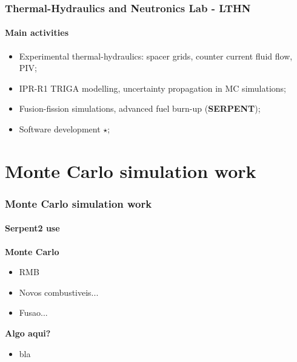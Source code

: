 \documentclass[svgnames,smaller,table]{beamer}
\begin{document}
\begin{frame}
  \frametitle{Thermal-Hydraulics and Neutronics Lab - LTHN}
  \framesubtitle{Main activities}
  \begin{center}
    \begin{itemize}
    \item Experimental thermal-hydraulics: spacer grids, counter current fluid flow, PIV;
    \item IPR-R1 TRIGA modelling, uncertainty propagation in MC simulations;
    \item Fusion-fission simulations, advanced fuel burn-up (\textbf{SERPENT});
    \item Software development $\star$;
    \end{itemize}
  \end{center}
\end{frame}

\section{Monte Carlo simulation work}
\begin{frame}
  \frametitle{Monte Carlo simulation work}
  \framesubtitle{Serpent2 use}
  \textbf{Monte Carlo}
    \begin{itemize}
    \item RMB
    \item Novos combustiveis...
    \item Fusao...
    \end{itemize}
    \vspace{10px}
  \textbf{Algo aqui?}
    \begin{itemize}
    \item bla
    \end{itemize}
\end{frame}
\end{document}
